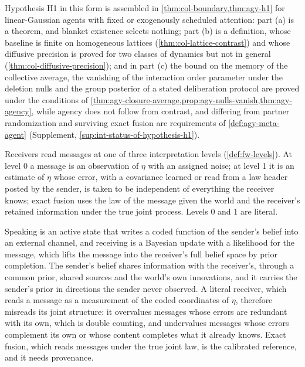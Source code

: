Hypothesis H1 in this form is assembled in \cref{thm:col-boundary,thm:agy-h1} for linear-Gaussian agents with fixed or exogenously scheduled attention: part (a) is a theorem, and blanket existence selects nothing; part (b) is a definition, whose baseline is finite on homogeneous lattices (\cref{thm:col-lattice-contrast}) and whose diffusive precision is proved for two classes of dynamics but not in general (\cref{thm:col-diffusive-precision}); and in part (c) the bound on the memory of the collective average, the vanishing of the interaction order parameter under the deletion nulls and the group posterior of a stated deliberation protocol are proved under the conditions of \cref{thm:agy-closure-average,prop:agy-nulls-vanish,thm:agy-agency}, while agency does not follow from contrast, and differing from partner randomization and surviving exact fusion are requirements of \cref{def:agy-meta-agent} (Supplement, \cref{sup:int-status-of-hypothesis-h1}).

Receivers read messages at one of three interpretation levels (\cref{def:fw-levels}). At level 0 a message is an observation of $\eta$ with an assigned noise; at level 1 it is an estimate of $\eta$ whose error, with a covariance learned or read from a law header posted by the sender, is taken to be independent of everything the receiver knows; exact fusion uses the law of the message given the world and the receiver's retained information under the true joint process. Levels 0 and 1 are literal.

\begin{hypothesis}\label{hyp:int-h2}
Speaking is an active state that writes a coded function of the sender's belief into an external channel, and receiving is a Bayesian update with a likelihood for the message, which lifts the message into the receiver's full belief space by prior completion. The sender's belief shares information with the receiver's, through a common prior, shared sources and the world's own innovations, and it carries the sender's prior in directions the sender never observed. A literal receiver, which reads a message as a measurement of the coded coordinates of $\eta$, therefore misreads its joint structure: it overvalues messages whose errors are redundant with its own, which is double counting, and undervalues messages whose errors complement its own or whose content completes what it already knows. Exact fusion, which reads messages under the true joint law, is the calibrated reference, and it needs provenance.
\end{hypothesis}

